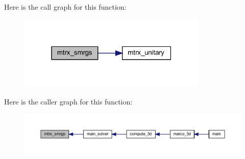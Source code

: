 Here is the call graph for this function\+:
\nopagebreak
\begin{figure}[H]
\begin{center}
\leavevmode
\includegraphics[width=255pt]{Marco_8f90_a8a072791471b5fe2faf76549b6845ab9_cgraph}
\end{center}
\end{figure}
Here is the caller graph for this function\+:
\nopagebreak
\begin{figure}[H]
\begin{center}
\leavevmode
\includegraphics[width=350pt]{Marco_8f90_a8a072791471b5fe2faf76549b6845ab9_icgraph}
\end{center}
\end{figure}
\mbox{\label{Marco_8f90_a34ea4787df30b5632f6a1785977f2402}} 
